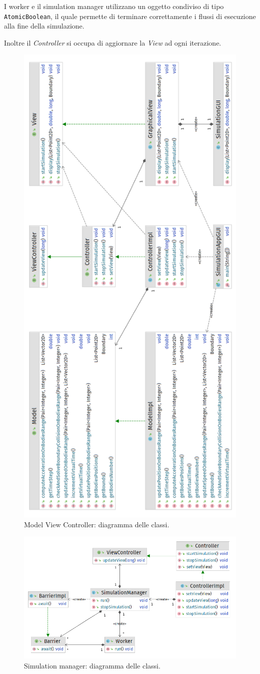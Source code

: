 \documentclass[12pt,a4paper,openright,twoside]{book}
\begin{document}
I worker e il simulation manager utilizzano un oggetto condiviso di tipo \texttt{AtomicBoolean}, 
il quale permette di terminare correttamente i flussi di esecuzione alla fine della simulazione.

Inoltre il \textit{Controller} si occupa di aggiornare la \textit{View} ad ogni iterazione.

\begin{figure}
	\centering
	\includegraphics[width=0.6\linewidth]{figures/MVC-class-diagram.png}
	\caption{Model View Controller: diagramma delle classi.}
	\label{fig:mvc}
\end{figure}

\begin{figure}
	\centering
	\includegraphics[width=\linewidth]{figures/simulation-manager.png}
	\caption{Simulation manager: diagramma delle classi.}
	\label{fig:SimulatioManager}
\end{figure}
\end{document}
